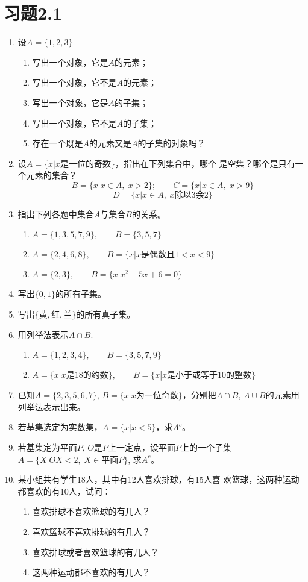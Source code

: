 \section*{习题2.1}
\begin{enumerate}
	\item 设$A=\{1, 2, 3\}$
	\begin{enumerate}
		\item 写出一个对象，它是$A$的元素；
		\item 写出一个对象，它不是$A$的元素；
		\item 写出一个对象，它是$A$的子集；
		\item 写出一个对象，它不是$A$的子集；
		\item 存在一个既是$A$的元素又是$A$的子集的对象吗？
	\end{enumerate}
	
	\item 设$A=\{x|x\text{是一位的奇数}\}$，指出在下列集合中，哪个
	是空集？哪个是只有一个元素的集合？
	\[B=\{x|x\in A,\; x>2\};\qquad C=\{x|x\in A,\;x>9\}\]
	\[D=\{x|x\in A,\;x\text{除以3余2}\}\]
	\item 指出下列各题中集合$A$与集合$B$的关系。
	\begin{enumerate}
		\item $A= \{1, 3, 5,7,9\},\qquad B=\{3,5,7\}$
		\item $A= \{2, 4, 6, 8\} ,\qquad B=\{x|x\text{是偶数且}1<x<9\}$
		\item $A= \{2, 3\} ,\qquad  B=\{x|x^2-5x+6=0\}$
	\end{enumerate}
	
	\item 写出$\{0, 1\}$的所有子集。
	\item 写出$\{\text{黄},\text{红},\text{兰}\}$的所有真子集。
	\item 用列举法表示$A\cap B$.
	\begin{enumerate}
		\item $A= \{1, 2, 3, 4\} ,\qquad B= \{3, 5, 7, 9\}$
		\item $A=\{x|x\text{是18的约数}\},\qquad B=\{x|x\text{是小于或等于10的整数}\}$
	\end{enumerate}
	
	\item 已知$A=\{2, 3, 5, 6, 7\}$, $B=\{x|x\text{为一位奇数}\}$，分别把$A\cap B$, $A\cup B$的元素用列举法表示出来。
	\item 若基集选定为实数集，$A=\{x|x<5\}$，求$A^c$。
	\item 若基集定为平面$P$, $O$是$P$上一定点，设平面$P$上的一个子集$A=\{X|OX<2,\; X\in \text{平面}P\}$, 求$A^c$。
	\item 某小组共有学生18人，其中有12人喜欢排球，有15人喜
	欢篮球，这两种运动都喜欢的有10人，试问：
	\begin{enumerate}
		\item 喜欢排球不喜欢篮球的有几人？   
		\item 喜欢篮球不喜欢排球的有几人？  
		\item 喜欢排球或者喜欢篮球的有几人？   
		\item 这两种运动都不喜欢的有几人？
	\end{enumerate}
\end{enumerate}

